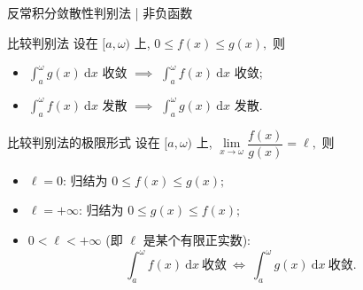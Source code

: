 \begin{frame}{反常积分敛散性判别法 | {\smaller[1] 非负函数}}

\begin{block}{比较判别法}
设在 $[a, \omega)$ 上, $0 \leqslant f(x) \leqslant g(x),$ 则
\begin{itemize}[<+->]
\item $\int_a^\omega g(x) ~ \mathrm{d} x $ 收敛 $\implies$ $\int_a^\omega f(x) ~ \mathrm{d} x $ 收敛;
\item $\int_a^\omega f(x) ~ \mathrm{d} x $ 发散 $\implies$ $\int_a^\omega g(x) ~ \mathrm{d} x $ 发散.
\end{itemize}
\end{block}


\begin{block}{比较判别法的极限形式}
设在 $[a, \omega)$ 上, $\lim\limits_{x \to \omega} \dfrac{f(x)}{g(x)} = \ell,$ 则
\begin{itemize}
\item $\ell = 0$:
\pause
归结为 $0 \leqslant f(x) \leqslant g(x);$
\pause
\item $\ell = +\infty$:
\pause
归结为 $0 \leqslant g(x) \leqslant f(x);$
\pause
\item $0 < \ell < +\infty$ (即 $\ell$ 是某个有限正实数):
\pause
\vspace{-0.5em}
\[\int_a^\omega f(x) ~ \mathrm{d} x ~ \text{收敛} ~ \Longleftrightarrow ~ \int_a^\omega g(x) ~ \mathrm{d} x ~ \text{收敛}.\]
\end{itemize}
\end{block}

\end{frame}


